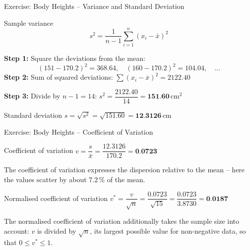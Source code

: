\documentclass[aspectratio=169,11pt]{beamer}
\begin{document}
\begin{frame}{Exercise: Body Heights -- Variance and Standard Deviation}
  \begin{block}{Sample variance}
    \[ s^2 = \frac{1}{n-1}\sum_{i=1}^{n}(x_i - \bar{x})^2 \]
  \end{block}
  \textbf{Step 1:} Square the deviations from the mean:
  \[
    (151 - 170.2)^2 = 368.64, \quad (160 - 170.2)^2 = 104.04, \quad \ldots
  \]
  \textbf{Step 2:} Sum of squared deviations:
  $\sum(x_i - \bar{x})^2 = 2122.40$

  \smallskip
  \textbf{Step 3:} Divide by $n - 1 = 14$:
  $s^2 = \dfrac{2122.40}{14} = \textbf{151.60}$\,cm$^2$

  \begin{block}{Standard deviation}
    $s = \sqrt{s^2} = \sqrt{151.60} = \textbf{12.3126}$\,cm
  \end{block}
\end{frame}

\begin{frame}{Exercise: Body Heights -- Coefficient of Variation}
  \begin{block}{Coefficient of variation}
    $v = \dfrac{s}{\bar{x}} = \dfrac{12.3126}{170.2} = \textbf{0.0723}$
  \end{block}
  \vspace{0.2cm}
  The coefficient of variation expresses the dispersion relative to the mean
  -- here the values scatter by about $7.2\,\%$ of the mean.
  \vspace{0.3cm}
  \begin{block}{Normalised coefficient of variation}
    $v^* = \dfrac{v}{\sqrt{n}} = \dfrac{0.0723}{\sqrt{15}} = \dfrac{0.0723}{3.8730} = \textbf{0.0187}$
  \end{block}
  \vspace{0.2cm}
  The normalised coefficient of variation additionally takes the sample size
  into account: $v$ is divided by $\sqrt{n}$, its largest possible value for
  non-negative data, so that $0 \le v^* \le 1$.
\end{frame}
\end{document}
